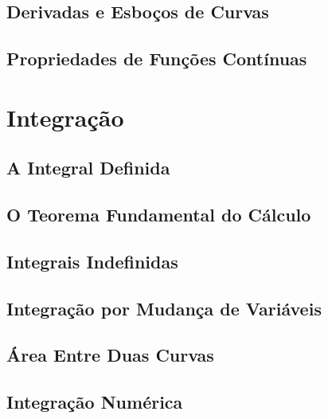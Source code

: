\documentclass{svmono}
\begin{document}
\section{Derivadas e Esboços de Curvas}
\label{sec:derivsketch}

\section{Propriedades de Funções Contínuas}
\label{sec:propcont}

\begin{chapterproblems}
\end{chapterproblems}

\chapter{Integração}
\label{chp:integration}

\section{A Integral Definida}
\label{sec:definiteint}

\section{O Teorema Fundamental do Cálculo}
\label{sec:fundamentaltheo}

\section{Integrais Indefinidas}
\label{sec:indefiniteint}

\section{Integração por Mudança de Variáveis}
\label{sec:changevar}

\section{Área Entre Duas Curvas}
\label{sec:areacurves}

\section{Integração Numérica}
\label{sec:numericalint}

\begin{chapterproblems}
\end{chapterproblems}
\end{document}
